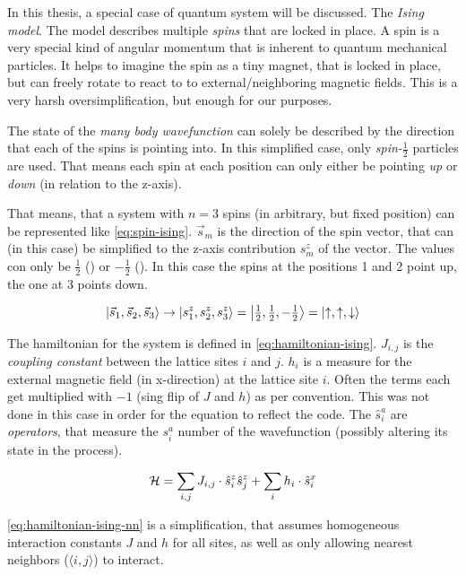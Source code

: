 In this thesis, a special case of quantum system will be discussed. 
The \emph{Ising model}.
The model describes multiple \emph{spins} that are locked in place. 
A spin is a very special kind of angular momentum that is inherent to quantum mechanical particles.
It helps to imagine the spin as a tiny magnet, that is locked in place, but can freely rotate to react to to external/neighboring  magnetic fields. This is a very harsh oversimplification, but enough for our purposes.

The state of the \emph{many body wavefunction} can solely be described by the direction that each of the spins is pointing into. In this simplified case, only \emph{spin-$\frac{1}{2}$} particles are used. That means each spin at each position can only either be pointing \emph{up} \up or \emph{down} \down (in relation to the z-axis).

That means, that a system with $n=3$ spins (in arbitrary, but fixed position) can be represented like \autoref{eq:spin-ising}. $\vec{s}_m$ is the direction of the spin vector, that can (in this case) be simplified to the z-axis contribution $s^z_m$ of the vector. The values con only be $\frac{1}{2}$ (\up) or $-\frac{1}{2}$ (\down).
In this case the spins at the positions 1 and 2 point up, the one at 3 points down.

\begin{equation}
    \label{eq:spin-ising}
    \ket{\vec{s}_1, \vec{s}_2, \vec{s}_3} \rightarrow \ket{s^z_{1}, s^z_{2}, s^z_{3}} = \ket{\tfrac{1}{2}, \tfrac{1}{2}, -\tfrac{1}{2}} = \ket{\uparrow, \uparrow, \downarrow}
\end{equation}

The hamiltonian for the system is defined in \autoref{eq:hamiltonian-ising}. $J_{i, j}$ is the \emph{coupling constant} between the lattice sites $i$ and $j$. $h_i$ is a measure for the external magnetic field (in x-direction) at the lattice site $i$. Often the terms each get multiplied with $-1$ (sing flip of $J$ and $h$) as per convention. This was not done in this case in order for the equation to reflect the code. The $\hat{s}^a_i$ are \emph{operators}, that measure the $s^a_i$ number of the wavefunction (possibly altering its state in the process).

\begin{equation}
    \label{eq:hamiltonian-ising}
    \mathcal{H} = \sum\limits_{i, j} J_{i, j} \cdot \hat{s}^z_i \hat{s}^z_j + \sum\limits_{i} h_i \cdot \hat{s}^x_i
\end{equation}

\autoref{eq:hamiltonian-ising-nn} is a simplification, that assumes homogeneous interaction constants $J$ and $h$ for all sites, as well as only allowing nearest neighbors ($\langle i, j\rangle$) to interact.

